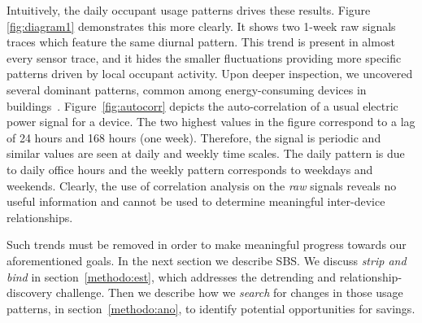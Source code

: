 Intuitively, the daily occupant usage patterns %
drives these results.
Figure \ref{fig:diagram1} demonstrates this more clearly.  It shows two 1-week raw signals traces which feature the same 
diurnal pattern.  
This trend is present in almost every sensor trace, and it hides 
the smaller fluctuations providing more specific patterns driven by local occupant activity.  Upon deeper inspection, we uncovered several
 dominant patterns, common among energy-consuming devices in buildings~\cite{wrinch:pes2012}.  Figure~\ref{fig:autocorr} depicts the 
 auto-correlation of a usual electric power signal for a device.  The two highest values in the figure correspond to a lag of 24 hours and 168 hours (one week).  
 Therefore, the signal is periodic and similar values are seen at daily and weekly time scales.
The daily pattern is due to daily office hours and the weekly pattern corresponds to weekdays and weekends.  
Clearly, the use of correlation analysis on the \emph{raw} signals reveals no useful information and cannot be used to determine meaningful 
inter-device relationships.  %

Such trends must be removed in order to make meaningful progress towards our aforementioned goals.  In the next section
we describe SBS.  We discuss \emph{strip and bind} in section~\ref{methodo:est}, which addresses the detrending and
relationship-discovery challenge.  Then we describe how we \emph{search} for changes in those usage patterns, 
in section~\ref{methodo:ano}, to identify potential opportunities for savings.


